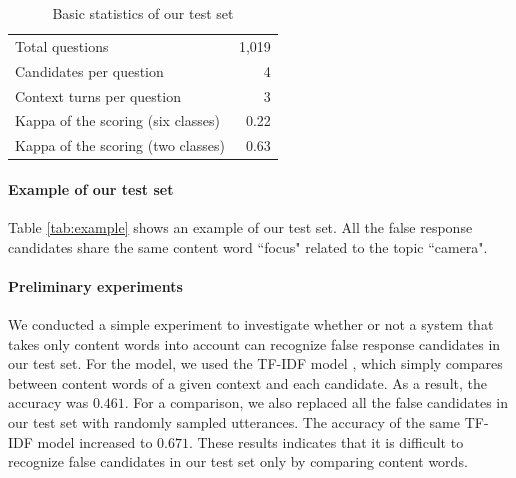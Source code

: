 \documentclass[11pt,a4paper]{article}
\begin{document}
\begin{table}[t]
\centering
\begin{tabular}{lr} \toprule
Total questions              & 1,019 \\
Candidates per question      & 4     \\
Context turns per question   & 3     \\
Kappa of the scoring (six classes) & 0.22 \\
Kappa of the scoring (two classes) & 0.63 \\ \bottomrule
\end{tabular}
\caption{Basic statistics of our test set}
\label{tab:statistics}
\end{table}

\paragraph{Example of our test set}
Table \ref{tab:example} shows an example of our test set.
All the false response candidates share the same content word ``focus" related to the topic ``camera".

\paragraph{Preliminary experiments}
We conducted a simple experiment to investigate whether or not a system that takes only content words into account can recognize false response candidates in our test set.
For the model, we used the TF-IDF model \cite{lowe-etal-2015-ubuntu}, which simply compares between content words of a given context and each candidate.
As a result, the accuracy was $0.461$.
For a comparison, we also replaced all the false candidates in our test set with randomly sampled utterances.
The accuracy of the same TF-IDF model increased to $0.671$.
These results indicates that it is difficult to recognize false candidates in our test set only by comparing content words.
\end{document}
